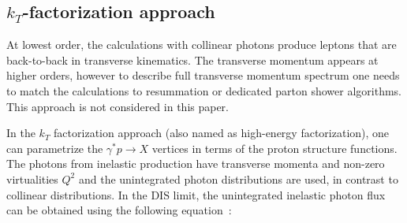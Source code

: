 \subsection{$k_T$-factorization approach}


At lowest order, the calculations with collinear photons  produce leptons that are back-to-back in transverse kinematics.
The transverse momentum appears at higher orders, however to describe full transverse momentum spectrum  one needs  
to match the calculations to resummation or dedicated parton shower algorithms. This approach is not considered in this paper.

In the $k_T$ factorization approach (also named as high-energy factorization), one can parametrize the $\gamma^*p \rightarrow X$ vertices in terms of the proton structure functions. The photons from inelastic production have transverse momenta and non-zero virtualities $Q^2$ and the unintegrated photon distributions are used, in contrast to collinear distributions.
In the DIS limit, the unintegrated inelastic photon flux can be obtained using the following equation~\cite{daSilveira:2014jla, Luszczak:2015aoa}:

